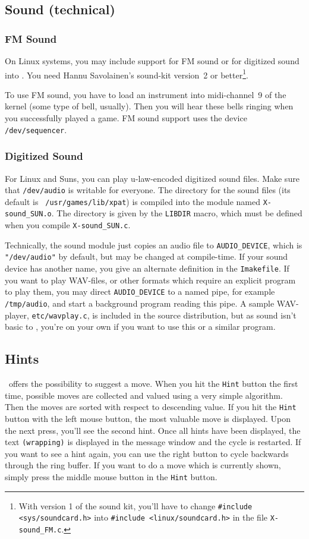 \subsection{Sound (technical)}
\subsubsection{FM Sound}
On Linux systems, you may include support for FM sound or for digitized sound
into \xpat. You need Hannu Savolainen's sound-kit
version~2 or better\footnote{With version 1 of the sound kit, you'll have to change
{\tt \#include <sys/soundcard.h>} into {\tt \#include <linux/soundcard.h>} in
the file {\tt X-sound\_FM.c}.}.

To use FM sound, you have to load an instrument into midi-channel~9 of
the kernel (some type of bell, usually).
Then you will hear these bells ringing when you successfully played a game.
FM sound support uses the device {\tt /dev/sequencer}.

\subsubsection{Digitized Sound}
For Linux and Suns, you can play u-law-encoded digitized sound files.
Make sure that {\tt /dev/audio} is writable for everyone.
The directory for the sound \hbox{files} (its default is {\tt
  /usr/games/lib/xpat}) is compiled into the module named {\tt X-sound\_SUN.o}.
The directory is given by the
{\tt LIBDIR} macro, which must be defined when you compile
{\tt X-sound\_SUN.c}.

Technically, the sound module just copies an audio file to
{\tt AUDIO\_DEVICE}, which is {\tt "/dev/audio"} by default, but may be changed
at compile-time. If your sound device has another name, you give
an alternate definition in the {\tt Imakefile}.
If you want to play WAV-files, or other formats which require an explicit
program to play them, you may direct {\tt AUDIO\_DEVICE} to a named pipe,
for example {\tt /tmp/audio}, and start a background program reading this pipe.
A sample WAV-player, {\tt etc/wavplay.c}, is included in the source
distribution, but as sound isn't basic to \xpat, you're on your own if you
want to use this or a similar program.

\subsection{Hints}
\xpat\ offers the possibility to suggest a move. When you hit the {\tt Hint}
button the first time, possible moves are collected and valued using a very
simple algorithm. Then the moves are sorted with respect to descending value.
If you hit the {\tt Hint} button with the left mouse button, the most valuable
move is displayed. Upon the next press, you'll see the second hint. Once all
hints have been displayed, the text {\tt (wrapping)} is displayed in the
message window and the cycle is restarted. If you want to see a hint again, you can
use the right button to cycle backwards through the ring buffer.
If you want to do a move which is currently shown, simply press the middle
mouse button in the {\tt Hint} button.

